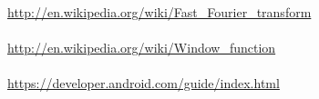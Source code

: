 
\url{http://en.wikipedia.org/wiki/Fast_Fourier_transform}\\
\\
\url{http://en.wikipedia.org/wiki/Window_function}\\
\\
\url{https://developer.android.com/guide/index.html}\\